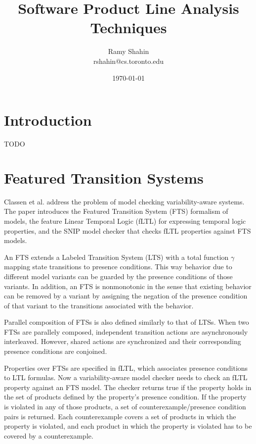 \documentclass[11pt]{article}
\title{Software Product Line Analysis Techniques}
\author{Ramy Shahin \\ rshahin@cs.toronto.edu}
\date{\today}                                           %
\begin{document}
\maketitle


\section{Introduction}
TODO

\section{Featured Transition Systems}

Classen et al.\cite{Classen:2013} address the problem of model checking variability-aware systems. The paper introduces the Featured Transition System (FTS) formalism of models, the feature Linear Temporal Logic (fLTL) for expressing temporal logic properties, and the SNIP model checker that checks fLTL properties against FTS models.

An FTS extends a Labeled Transition System (LTS) with a total function $\gamma$ mapping state transitions to presence conditions. This way behavior due to different model variants can be guarded by the presence conditions of those variants. In addition, an FTS is nonmonotonic in the sense that existing behavior can be removed by a variant by assigning the negation of the presence condition of that variant to the transitions associated with the behavior.

Parallel composition of FTSs is also defined similarly to that of LTSs. When two FTSs are parallely composed, independent transition actions are asynchronously interleaved. However, shared actions are synchronized and their corresponding presence conditions are conjoined. 

Properties over FTSs are specified in fLTL, which associates presence conditions to LTL formulas. Now a variability-aware model checker needs to check an fLTL property against an FTS model. The checker returns true if the property holds in the set of products defined by the property's presence condition. If the property is violated in any of those products, a set of counterexample/presence condition pairs is returned. Each counterexample covers a set of products in which the property is violated, and each product in which the property is violated  has to be covered by a counterexample.
\end{document}
